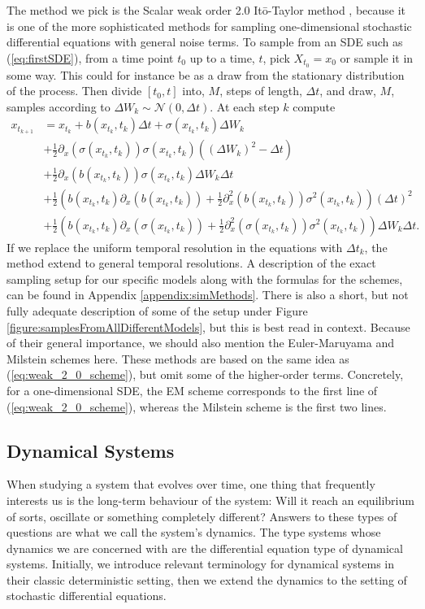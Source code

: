 The method we pick is the Scalar weak order 2.0 Itō-Taylor method \cite[Algorithm 8.5]{Srkk2019}, because it is one of the more sophisticated methods for sampling one-dimensional stochastic differential equations with general noise terms. To sample from an SDE such as (\ref{eq:firstSDE}), from a time point $t_0$ up to a time, $t$, pick $X_{t_0} = x_0$ or sample it in some way. This could for instance be as a draw from the stationary distribution of the process. Then divide $[t_0, t]$ into, $M$, steps of length, $\Delta t$, and draw, $M$, samples according to $\Delta W_k\sim\mathcal{N}\left(0, \Delta t\right)$. At each step $k$ compute
\begin{align}
    x_{t_{k + 1}} &= x_{t_{k}} + b(x_{t_{k}}, t_k)\Delta t + \sigma\left(x_{t_{k}}, t_k\right)\Delta W_k \nonumber \\
    &+ \frac{1}{2}\partial_x \left(\sigma\left(x_{t_{k}}, t_k\right)\right)\sigma\left(x_{t_{k}}, t_k\right)\left(\left(\Delta W_k\right)^2 - \Delta t\right) \nonumber \\
    &+ \frac{1}{2}\partial_x \left(b(x_{t_{k}}, t_k)\right)\sigma(x_{t_{k}}, t_k) \Delta W_k\Delta t \nonumber \\
    &+ \frac{1}{2}\left(b(x_{t_{k}}, t_k)\partial_x\left(b(x_{t_{k}}, t_k)\right) + \frac{1}{2}\partial_x^2\left(b\left(x_{t_k}, t_k\right)\right)\sigma^2(x_{t_k}, t_k)\right)\left(\Delta t\right)^2 \nonumber \\
    &+ \frac{1}{2}\left(b(x_{t_{k}}, t_k)\partial_x \left(\sigma(x_{t_{k}}, t_k)\right) + \frac{1}{2}\partial_x^2\left(\sigma(x_{t_k}, t_k)\right)\sigma^2(x_{t_k}, t_k)\right)\Delta W_k\Delta t. \label{eq:weak_2_0_scheme}
\end{align}
If we replace the uniform temporal resolution in the equations with $\Delta t_k$, the method extend to general temporal resolutions.
A description of the exact sampling setup for our specific models along with the formulas for the schemes, can be found in Appendix \ref{appendix:simMethods}. There is also a short, but not fully adequate description of some of the setup under Figure \ref{figure:samplesFromAllDifferentModels}, but this is best read in context. Because of their general importance, we should also mention the Euler-Maruyama and Milstein schemes here. These methods are based on the same idea as (\ref{eq:weak_2_0_scheme}), but omit some of the higher-order terms. Concretely, for a one-dimensional SDE, the EM scheme corresponds to the first line of (\ref{eq:weak_2_0_scheme}), whereas the Milstein scheme is the first two lines.
\subsection{Dynamical Systems}
When studying a system that evolves over time, one thing that frequently interests us is the long-term behaviour of the system: Will it reach an equilibrium of sorts, oscillate or something completely different? Answers to these types of questions are what we call the system's dynamics. The type systems whose dynamics we are concerned with are the differential equation type of dynamical systems. Initially, we introduce relevant terminology for dynamical systems in their classic deterministic setting, then we extend the dynamics to the setting of stochastic differential equations. 
